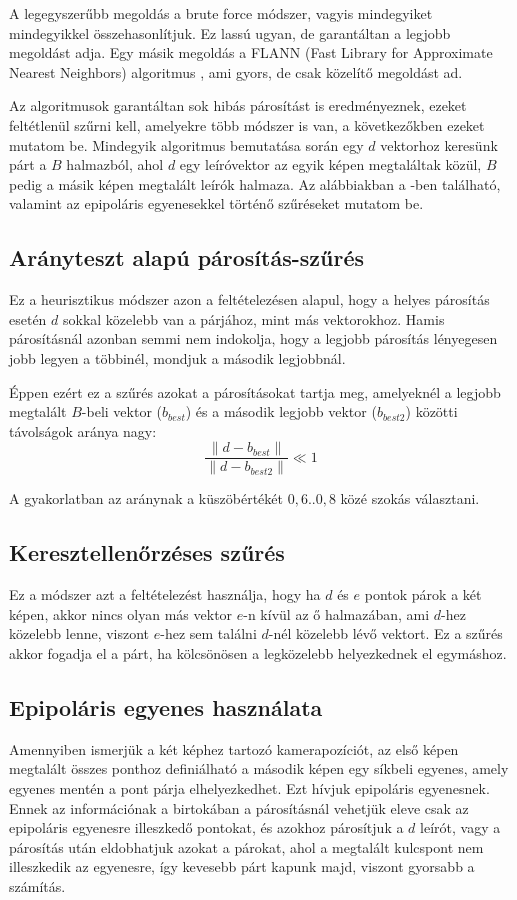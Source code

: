 	A legegyszerűbb megoldás a brute force módszer, vagyis mindegyiket mindegyikkel összehasonlítjuk. Ez lassú ugyan, de garantáltan a legjobb megoldást adja. Egy másik megoldás a FLANN (Fast Library for Approximate Nearest Neighbors) algoritmus \cite{muja_flann_2009}, ami gyors, de csak közelítő megoldást ad.
	
	Az algoritmusok garantáltan sok hibás párosítást is eredményeznek, ezeket feltétlenül szűrni kell, amelyekre több módszer is van, a következőkben ezeket mutatom be. Mindegyik algoritmus bemutatása során egy $d$ vektorhoz keresünk párt a $B$ halmazból, ahol $d$ egy leíróvektor az egyik képen megtaláltak közül, $B$ pedig a másik képen megtalált leírók halmaza. Az alábbiakban a \cite{OpenCV}-ben található, valamint az epipoláris egyenesekkel történő szűréseket mutatom be.
	
	\subsection{Arányteszt alapú párosítás-szűrés}
	Ez a heurisztikus módszer azon a feltételezésen alapul, hogy a helyes párosítás esetén $d$ sokkal közelebb van a párjához, mint más vektorokhoz. Hamis párosításnál azonban semmi nem indokolja, hogy a legjobb párosítás lényegesen jobb legyen a többinél, mondjuk a második legjobbnál.
	
	Éppen ezért ez a szűrés azokat a párosításokat tartja meg, amelyeknél a legjobb megtalált $B$-beli vektor ($b_{best}$) és a második legjobb vektor ($b_{best2}$) közötti távolságok aránya nagy:
	\begin{equation}
	\frac{\|d-b_{best}\|}{\|d-b_{best2}\|}\ll 1
	\end{equation}
	
	A gyakorlatban az aránynak a küszöbértékét $0,6..0,8$ közé szokás választani.
	
	\subsection{Keresztellenőrzéses szűrés}
	\label{match-cross}
	Ez a módszer azt a feltételezést használja, hogy ha $d$ és $e$ pontok párok a két képen, akkor nincs olyan más vektor $e$-n kívül az ő halmazában, ami $d$-hez közelebb lenne, viszont $e$-hez sem találni $d$-nél közelebb lévő vektort. Ez a szűrés akkor fogadja el a párt, ha kölcsönösen a legközelebb helyezkednek el egymáshoz.
	
	\subsection{Epipoláris egyenes használata}
	\label{match-epilines}
	Amennyiben ismerjük a két képhez tartozó kamerapozíciót, az első képen megtalált összes ponthoz definiálható a második képen egy síkbeli egyenes, amely egyenes mentén a pont párja elhelyezkedhet. Ezt hívjuk epipoláris egyenesnek. Ennek az információnak a birtokában a párosításnál vehetjük eleve csak az epipoláris egyenesre illeszkedő pontokat, és azokhoz párosítjuk a $d$ leírót, vagy a párosítás után eldobhatjuk azokat a párokat, ahol a megtalált kulcspont nem illeszkedik az egyenesre, így kevesebb párt kapunk majd, viszont gyorsabb a számítás.
	
